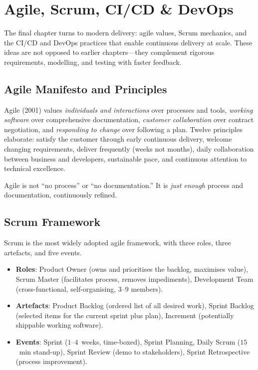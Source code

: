 \chapter{Agile, Scrum, CI/CD \& DevOps}
\label{ch:agile}

The final chapter turns to modern delivery: agile values, Scrum mechanics, and the CI/CD and DevOps practices that enable continuous delivery at scale. These ideas are not opposed to earlier chapters---they complement rigorous requirements, modelling, and testing with faster feedback.

\section{Agile Manifesto and Principles}

Agile (2001) values \emph{individuals and interactions} over processes and tools, \emph{working software} over comprehensive documentation, \emph{customer collaboration} over contract negotiation, and \emph{responding to change} over following a plan. Twelve principles elaborate: satisfy the customer through early continuous delivery, welcome changing requirements, deliver frequently (weeks not months), daily collaboration between business and developers, sustainable pace, and continuous attention to technical excellence.

Agile is not ``no process'' or ``no documentation.'' It is \emph{just enough} process and documentation, continuously refined.

\section{Scrum Framework}

Scrum is the most widely adopted agile framework, with three roles, three artefacts, and five events.

\begin{itemize}
    \item \textbf{Roles}: Product Owner (owns and prioritises the backlog, maximises value), Scrum Master (facilitates process, removes impediments), Development Team (cross-functional, self-organising, $3$--$9$ members).
    \item \textbf{Artefacts}: Product Backlog (ordered list of all desired work), Sprint Backlog (selected items for the current sprint plus plan), Increment (potentially shippable working software).
    \item \textbf{Events}: Sprint ($1$--$4$~weeks, time-boxed), Sprint Planning, Daily Scrum ($15$~min stand-up), Sprint Review (demo to stakeholders), Sprint Retrospective (process improvement).
\end{itemize}

